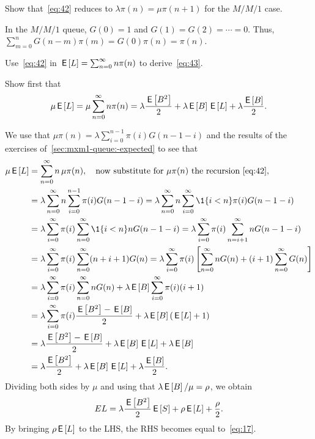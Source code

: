 \begin{exercise}\label{ex:27}
 Show that~\cref{eq:42} reduces to $\lambda \pi(n) = \mu \pi(n+1)$ for the $M/M/1$ case.
\begin{solution}
  In the $M/M/1$ queue, $G(0)=1$ and $G(1)=G(2)=\cdots = 0$.
  Thus, $\sum_{m=0}^n G(n-m) \pi(m) = G(0)\pi(n)=\pi(n)$.
\end{solution}
\end{exercise}



\begin{exercise}\label{ex:73}
Use~\cref{eq:42} 
in $\,\mathsf{E}\left[L\right] = \sum_{n=0}^\infty n \pi(n)$ to derive~\cref{eq:43}.
\begin{hint}
  Show first that 
\begin{equation*}
 \mu \,\mathsf{E}\left[L\right] =\mu \sum_{n=0}^\infty n \pi(n) = \lambda \frac{\,\mathsf{E}\left[B^2\right]}2 + \lambda \,\mathsf{E}\left[B\right] \,\mathsf{E}\left[L\right] +\lambda \frac{\,\mathsf{E}\left[B\right]}2.
\end{equation*}
\end{hint}
\begin{solution}
 We use that $\mu \pi(n) =\lambda \sum_{i=0}^{n-1} \pi(i) G(n-1-i)$ and the results of the exercises of~\cref{sec:mxm1-queue:-expected} to see that
\begin{align*}
 \mu \E \L
 &=\sum_{n=0}^\infty n\, \mu \pi(n), \quad \text{now substitute for $\mu \pi(n)$ the recursion~\cref{eq:42}}, \\
& =\lambda \sum_{n=0}^\infty n \sum_{i=0}^{n-1} \pi(i) G(n-1-i) 
 =\lambda \sum_{n=0}^\infty n \sum_{i=0}^\infty \1{i<n} \pi(i) G(n-1-i) \\
& =\lambda \sum_{i=0}^\infty \pi(i) \sum_{n=0}^\infty \1{i<n} n G(n-1-i) 
 =\lambda \sum_{i=0}^\infty \pi(i) \sum_{n=i+1}^\infty n G(n-1-i) \\
& =\lambda \sum_{i=0}^\infty \pi(i) \sum_{n=0}^\infty (n+i+1) G(n) 
 =\lambda \sum_{i=0}^\infty \pi(i) \left[\sum_{n=0}^\infty n G(n) +(i+1) \sum_{n=0}^\infty G(n)\right] \\
 &=\lambda \sum_{i=0}^\infty \pi(i)\sum_{n=0}^\infty n G(n) +\lambda \E B \sum_{i=0}^\infty \pi(i) (i+1) \\ 
 &=\lambda \sum_{i=0}^\infty \pi(i) \frac{\E{B^2} -\E B}2 + \lambda \E B (\E \L +1) \\ 
 &= \lambda \frac{\E{B^2} -\E B}2 + \lambda \E B \E \L +\lambda \E B \\
 &= \lambda \frac{\E{B^2} }2 + \lambda \E B \E \L +\lambda \frac{\E B}2.
\end{align*}
Dividing both sides by $\mu$ and using that $\lambda \,\mathsf{E}\left[B\right]/\mu = \rho$, we obtain
\begin{equation*}
E L = \lambda \frac{\,\mathsf{E}\left[B^2\right]}2 \,\mathsf{E}\left[S\right] + \rho \,\mathsf{E}\left[L\right] + \frac\rho2.
\end{equation*}
By bringing $\rho \,\mathsf{E}\left[L\right]$ to the LHS, the RHS becomes equal to~\cref{eq:17}. 
\end{solution}
\end{exercise}



